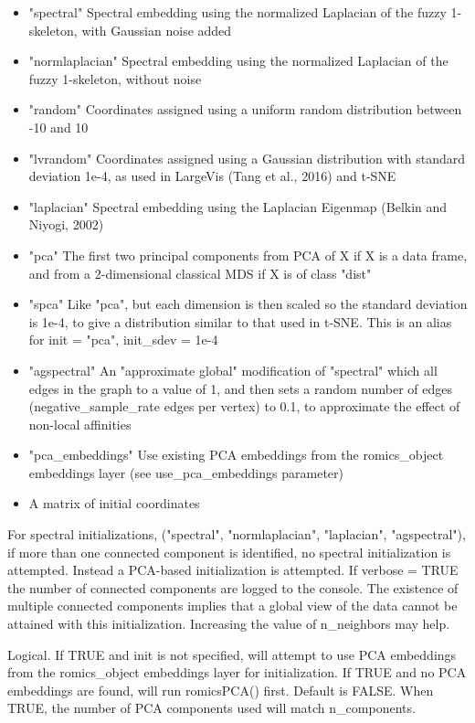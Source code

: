 \documentclass[a4paper]{book}
\begin{document}
\begin{Arguments}
\begin{ldescription}
\begin{itemize}
\item{} "spectral" Spectral embedding using the normalized Laplacian of the fuzzy 1-skeleton, with Gaussian noise added
\item{} "normlaplacian" Spectral embedding using the normalized Laplacian of the fuzzy 1-skeleton, without noise
\item{} "random" Coordinates assigned using a uniform random distribution between -10 and 10
\item{} "lvrandom" Coordinates assigned using a Gaussian distribution with standard deviation 1e-4, as used in LargeVis (Tang et al., 2016) and t-SNE
\item{} "laplacian" Spectral embedding using the Laplacian Eigenmap (Belkin and Niyogi, 2002)
\item{} "pca" The first two principal components from PCA of X if X is a data frame, and from a 2-dimensional classical MDS if X is of class "dist"
\item{} "spca" Like "pca", but each dimension is then scaled so the standard deviation is 1e-4, to give a distribution similar to that used in t-SNE. This is an alias for init = "pca", init\_sdev = 1e-4
\item{} "agspectral" An "approximate global" modification of "spectral" which all edges in the graph to a value of 1, and then sets a random number of edges (negative\_sample\_rate edges per vertex) to 0.1, to approximate the effect of non-local affinities
\item{} "pca\_embeddings" Use existing PCA embeddings from the romics\_object embeddings layer (see use\_pca\_embeddings parameter)
\item{} A matrix of initial coordinates

\end{itemize}

For spectral initializations, ("spectral", "normlaplacian", "laplacian", "agspectral"), if more than one connected component is identified, no spectral initialization is attempted. Instead a PCA-based initialization is attempted. If verbose = TRUE the number of connected components are logged to the console. The existence of multiple connected components implies that a global view of the data cannot be attained with this initialization. Increasing the value of n\_neighbors may help.

\item[\code{use\_pca\_embeddings}] Logical. If TRUE and init is not specified, will attempt to use PCA embeddings from the romics\_object embeddings layer for initialization.
If TRUE and no PCA embeddings are found, will run romicsPCA() first. Default is FALSE.
When TRUE, the number of PCA components used will match n\_components.


\end{ldescription}
\end{Arguments}
\end{document}

